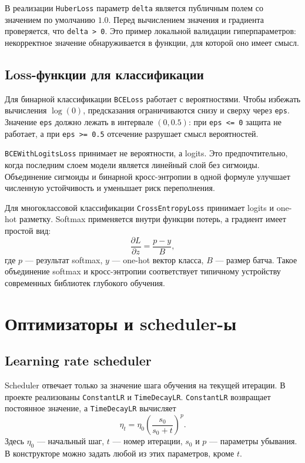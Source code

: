 \documentclass{article}
\begin{document}
В реализации \texttt{HuberLoss} параметр \texttt{delta} является
публичным полем со значением по умолчанию $1.0$. Перед вычислением
значения и градиента проверяется, что \texttt{delta > 0}. Это пример
локальной валидации гиперпараметров: некорректное значение
обнаруживается в функции, для которой оно имеет смысл.

\subsection{Loss-функции для классификации}

Для бинарной классификации \texttt{BCELoss} работает с вероятностями.
Чтобы избежать вычисления $\log(0)$, предсказания ограничиваются снизу
и сверху через \texttt{eps}. Значение \texttt{eps} должно лежать в
интервале $(0, 0.5)$: при \texttt{eps <= 0} защита не работает, а при
\texttt{eps >= 0.5} отсечение разрушает смысл вероятностей.

\texttt{BCEWithLogitsLoss} принимает не вероятности, а logits. Это
предпочтительно, когда последним слоем модели является линейный слой
без сигмоиды. Объединение сигмоиды и бинарной кросс-энтропии в одной
формуле улучшает численную устойчивость и уменьшает риск переполнения.

Для многоклассовой классификации \texttt{CrossEntropyLoss} принимает
logits и one-hot разметку. Softmax применяется внутри функции потерь,
а градиент имеет простой вид:
\[
    \frac{\partial L}{\partial z} = \frac{p - y}{B},
\]
где $p$ --- результат softmax, $y$ --- one-hot вектор класса, $B$ ---
размер батча. Такое объединение softmax и кросс-энтропии соответствует
типичному устройству современных библиотек глубокого обучения.

\section{Оптимизаторы и scheduler-ы}

\subsection{Learning rate scheduler}

Scheduler отвечает только за значение шага обучения на текущей
итерации. В проекте реализованы \texttt{ConstantLR} и
\texttt{TimeDecayLR}. \texttt{ConstantLR} возвращает постоянное
значение, а \texttt{TimeDecayLR} вычисляет
\[
    \eta_t = \eta_0 \left(\frac{s_0}{s_0 + t}\right)^p.
\]
Здесь $\eta_0$ --- начальный шаг, $t$ --- номер итерации, $s_0$ и $p$
--- параметры убывания. В конструкторе можно задать любой из этих параметров, кроме $t$.
\end{document}
